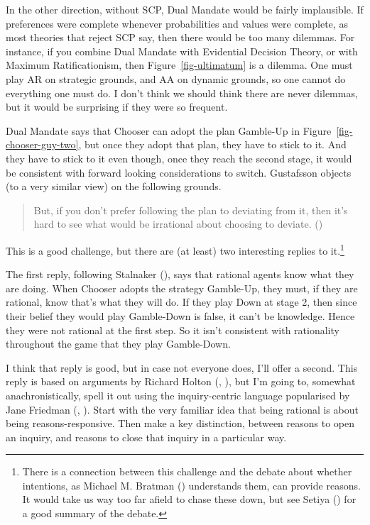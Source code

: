 \documentclass[
  10pt,
  letterpaper,
  DIV=11,
  numbers=noendperiod,
  twoside]{scrartcl}
\begin{document}
In the other direction, without SCP, Dual Mandate would be fairly
implausible. If preferences were complete whenever probabilities and
values were complete, as most theories that reject SCP say, then there
would be too many dilemmas. For instance, if you combine Dual Mandate
with Evidential Decision Theory, or with Maximum Ratificationism, then
Figure~\ref{fig-ultimatum} is a dilemma. One must play AR on strategic
grounds, and AA on dynamic grounds, so one cannot do everything one must
do. I don't think we should think there are never dilemmas, but it would
be surprising if they were so frequent.

Dual Mandate says that Chooser can adopt the plan Gamble-Up in
Figure~\ref{fig-chooser-guy-two}, but once they adopt that plan, they
have to stick to it. And they have to stick to it even though, once they
reach the second stage, it would be consistent with forward looking
considerations to switch. Gustafsson objects (to a very similar view) on
the following grounds.

\begin{quote}
But, if you don't prefer following the plan to deviating from it, then
it's hard to see what would be irrational about choosing to deviate.
()
\end{quote}

This is a good challenge, but there are (at least) two interesting
replies to it.\footnote{There is a connection between this challenge and
  the debate about whether intentions, as Michael M. Bratman
  () understands them, can provide
  reasons. It would take us way too far afield to chase these down, but
  see Setiya () for a good
  summary of the debate.}

The first reply, following Stalnaker
(), says that rational agents know
what they are doing. When Chooser adopts the strategy Gamble-Up, they
must, if they are rational, know that's what they will do. If they play
Down at stage 2, then since their belief they would play Gamble-Down is
false, it can't be knowledge. Hence they were not rational at the first
step. So it isn't consistent with rationality throughout the game that
they play Gamble-Down.

I think that reply is good, but in case not everyone does, I'll offer a
second. This reply is based on arguments by Richard Holton
(, ), but
I'm going to, somewhat anachronistically, spell it out using the
inquiry-centric language popularised by Jane Friedman
(, ).
Start with the very familiar idea that being rational is about being
reasons-responsive. Then make a key distinction, between reasons to open
an inquiry, and reasons to close that inquiry in a particular way.
\end{document}
